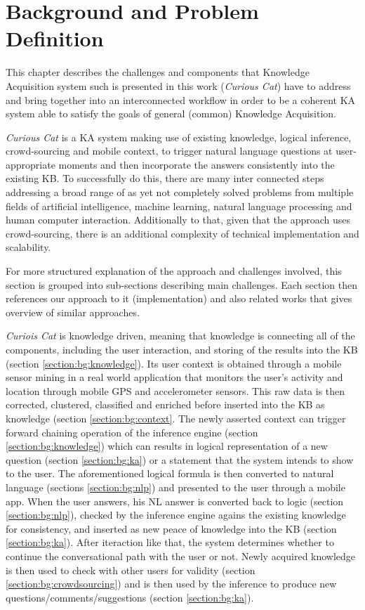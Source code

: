 %
\chapter{Background and Problem Definition}
\label{chapter:background}
This chapter describes the challenges and components that Knowledge Acquisition 
system such is presented in this work (\emph{Curious Cat}) have to address and 
bring together into an interconnected workflow in order to be a coherent 
KA system able to satisfy the goals of general (common) Knowledge Acquisition. 

\emph{Curious Cat} is a KA system making use of existing knowledge, 
logical inference, crowd-sourcing and mobile context, to trigger natural language
questions at user-appropriate moments and then incorporate the answers consistently
into the existing KB. To successfully do this, there are many inter connected
steps addressing a broad range of as yet not completely solved problems from
multiple fields of artificial intelligence, machine learning, natural language
processing and human computer interaction. Additionally to that, given
that the approach uses crowd-sourcing, there is an additional complexity
of technical implementation and scalability. 

For more structured explanation of the approach and challenges involved, this
section is grouped into sub-sections describing main challenges. Each section
then references our approach to it (implementation) and also related works that
gives overview of similar approaches.

\emph{Curiois Cat} is knowledge driven, meaning that knowledge is connecting
all of the components, including the user interaction, and storing of the
results into the KB (section \ref{section:bg:knowledge}). Its user context is 
obtained through a mobile sensor mining in a real world application that 
monitors the user’s activity and location through mobile GPS and accelerometer 
sensors. This raw data is then corrected, clustered, classified and enriched 
before inserted into the KB as knowledge (section \ref{section:bg:context}.
The newly asserted context can trigger forward chaining operation of the 
inference engine (section \ref{section:bg:knowledge}) which can results in
logical representation of a new question (section \ref{section:bg:ka}) or a 
statement that the system intends to show to the user. The aforementioned  
logical formula is then converted to natural language (sections 
\ref{section:bg:nlp}) and presented to the user through a mobile app. 
When the user answers, his NL answer is converted back to logic 
(section \ref{section:bg:nlp}), checked by the inference engine agains the 
existing knowledge for consistency, and inserted as new peace of knowledge into 
the KB (section \ref{section:bg:ka}). After iteraction like that, the
system determines whether to continue the conversational path with the user or
 not. Newly acquired knowledge is then used to check with other users for
validity (section \ref{section:bg:crowdsourcing}) and is then used by the 
inference to produce new questions/comments/suggestions (section 
\ref{section:bg:ka}).

